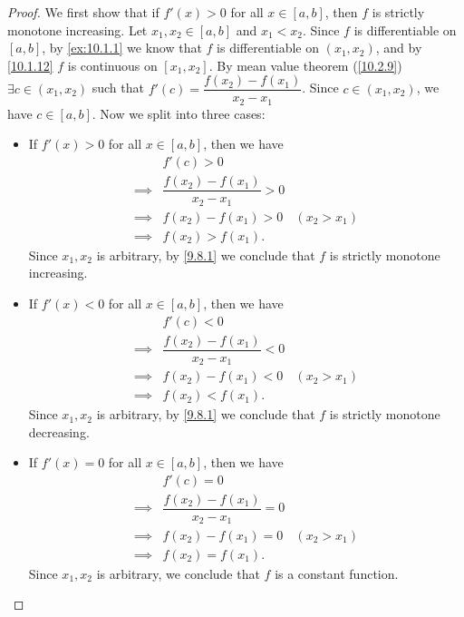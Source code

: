 \begin{proof}
  We first show that if \(f'(x) > 0\) for all \(x \in [a, b]\), then \(f\) is strictly monotone increasing.
  Let \(x_1, x_2 \in [a, b]\) and \(x_1 < x_2\).
  Since \(f\) is differentiable on \([a, b]\), by \cref{ex:10.1.1} we know that \(f\) is differentiable on \((x_1, x_2)\), and by \cref{10.1.12} \(f\) is continuous on \([x_1, x_2]\).
  By mean value theorem (\cref{10.2.9}) \(\exists c \in (x_1, x_2)\) such that \(f'(c) = \dfrac{f(x_2) - f(x_1)}{x_2 - x_1}\).
  Since \(c \in (x_1, x_2)\), we have \(c \in [a, b]\).
  Now we split into three cases:
  \begin{itemize}
    \item If \(f'(x) > 0\) for all \(x \in [a, b]\), then we have
          \begin{align*}
                     & f'(c) > 0                                            \\
            \implies & \dfrac{f(x_2) - f(x_1)}{x_2 - x_1} > 0               \\
            \implies & f(x_2) - f(x_1) > 0                    & (x_2 > x_1) \\
            \implies & f(x_2) > f(x_1).
          \end{align*}
          Since \(x_1, x_2\) is arbitrary, by \cref{9.8.1} we conclude that \(f\) is strictly monotone increasing.
    \item If \(f'(x) < 0\) for all \(x \in [a, b]\), then we have
          \begin{align*}
                     & f'(c) < 0                                            \\
            \implies & \dfrac{f(x_2) - f(x_1)}{x_2 - x_1} < 0               \\
            \implies & f(x_2) - f(x_1) < 0                    & (x_2 > x_1) \\
            \implies & f(x_2) < f(x_1).
          \end{align*}
          Since \(x_1, x_2\) is arbitrary, by \cref{9.8.1} we conclude that \(f\) is strictly monotone decreasing.
    \item If \(f'(x) = 0\) for all \(x \in [a, b]\), then we have
          \begin{align*}
                     & f'(c) = 0                                            \\
            \implies & \dfrac{f(x_2) - f(x_1)}{x_2 - x_1} = 0               \\
            \implies & f(x_2) - f(x_1) = 0                    & (x_2 > x_1) \\
            \implies & f(x_2) = f(x_1).
          \end{align*}
          Since \(x_1, x_2\) is arbitrary, we conclude that \(f\) is a constant function.
  \end{itemize}
\end{proof}

